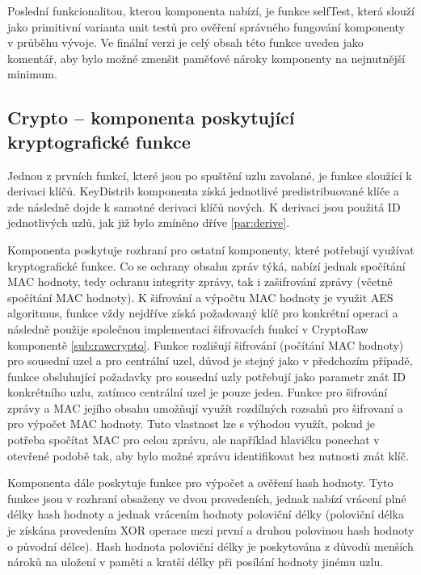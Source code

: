 \documentclass[11pt,final,twoside]{fithesis2}
\begin{document}
Poslední funkcionalitou, kterou komponenta nabízí, je funkce selfTest, která slouží jako primitivní varianta unit testů pro ověření správného fungování komponenty v průběhu vývoje. Ve finální verzi je
celý obsah této funkce uveden jako komentář, aby bylo možné zmenšit paměťové nároky komponenty na nejnutnější minimum. 

\subsection{Crypto -- komponenta poskytující kryptografické funkce} \label{sub:crypto}

Jednou z prvních funkcí, které jsou po spuštění uzlu zavolané, je funkce sloužící k derivaci klíčů. KeyDistrib komponenta získá jednotlivé predistribuované klíče a zde následně dojde 
k samotné derivaci klíčů nových. K derivaci jsou použitá ID jednotlivých uzlů, jak již bylo zmíněno dříve \ref{par:derive}.

Komponenta poskytuje rozhraní pro ostatní komponenty, které potřebují využívat kryptografické funkce. Co se ochrany obsahu zpráv týká, nabízí jednak spočítání MAC hodnoty, tedy ochranu integrity zprávy, 
tak i zašifrování zprávy (včetně spočítání MAC hodnoty). K šifrování a výpočtu MAC hodnoty je využit AES algoritmus, funkce vždy nejdříve získá požadovaný klíč pro konkrétní operaci a následně použije 
společnou implementaci šifrovacích funkcí v CryptoRaw komponentě \ref{sub:rawcrypto}. Funkce rozlišují šifrování (počítání MAC hodnoty) pro sousední uzel a pro centrální uzel, důvod je stejný jako v 
předchozím případě, funkce obsluhující požadavky pro sousední uzly potřebují jako parametr znát ID konkrétního uzlu, zatímco centrální uzel je pouze jeden. Funkce pro šifrování zprávy a MAC jejího obsahu 
umožňují využít rozdílných rozsahů pro šifrovaní a pro výpočet MAC hodnoty. Tuto 
vlastnost lze s výhodou využít, pokud je potřeba spočítat MAC pro celou zprávu, ale například hlavičku ponechat v otevřené podobě tak, 
aby bylo možné zprávu identifikovat bez nutnosti znát klíč. 

Komponenta dále poskytuje funkce pro výpočet a ověření hash hodnoty. Tyto funkce jsou v rozhraní obsaženy ve dvou provedeních, jednak nabízí vrácení plné délky hash hodnoty a jednak vrácením hodnoty 
poloviční délky (poloviční délka je získána provedením XOR operace mezi první a druhou polovinou hash hodnoty o původní délce). Hash hodnota poloviční délky je poskytována z důvodů menších nároků na uložení 
v paměti a kratší délky při posílání hodnoty jinému uzlu. 
\end{document}
